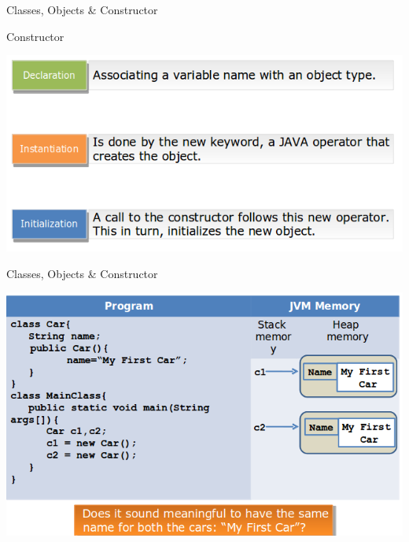 \documentclass[14pt]{beamer}
\begin{document}
\begin{frame}{Classes, Objects \& Constructor}

\begin{block}{}
    Constructor
\end{block}
\begin{center}
              \includegraphics[scale=0.5]{COJ-M01-S03-Image18.png}
                                \end{center}
\end{frame}
                                                  

\begin{frame}[fragile]{Classes, Objects \& Constructor}


\begin{center}
              \includegraphics[scale=0.5]{COJ-M01-S03-Image19.png}
                                \end{center}
\end{frame}
\end{document}
